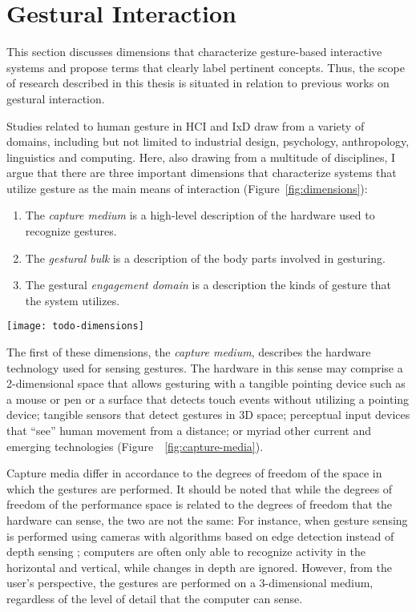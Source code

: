 \section{Gestural Interaction}
\label{sec:gestural-interaction}

This section discusses dimensions that characterize gesture-based interactive systems and propose terms that clearly label pertinent concepts. Thus, the scope of research described in this thesis is situated in relation to previous works on gestural interaction.

Studies related to human gesture in HCI and IxD draw from a variety of domains, including but not limited to industrial design, psychology, anthropology, linguistics and computing. Here, also drawing from a multitude of disciplines, I argue that there are three important dimensions that characterize systems that utilize gesture as the main means of interaction (Figure~\ref{fig:dimensions}):

\begin{enumerate}
\item The \emph{capture medium} is a high-level description of the hardware used to recognize gestures.
\item	The \emph{gestural bulk} is a description of the body parts involved in gesturing.
\item The gestural \emph{engagement domain} is a description the kinds of gesture that the system utilizes.
\end{enumerate}

\begin{SCfigure}[\sidecaptionrelwidth][ht]
\centering
\texttt{[image: todo-dimensions]}
\caption{Visualizing the three dimensions that characterize gesture-based interactive systems.}
\label{fig:dimensions}
\end{SCfigure}

The first of these dimensions, the \emph{capture medium}, describes the hardware technology used for sensing gestures. The hardware in this sense may comprise a 2-dimensional space that allows gesturing with a tangible pointing device such as a mouse or pen or a surface that detects touch events without utilizing a pointing device; tangible sensors that detect gestures in 3D space; perceptual input devices that “see” human movement from a distance; or myriad other current and emerging technologies (Figure~~\ref{fig:capture-media}).

Capture media differ in accordance to the degrees of freedom of the space in which the gestures are performed. It should be noted that while the degrees of freedom of the performance space is related to the degrees of freedom that the hardware can sense, the two are not the same: For instance, when gesture sensing is performed using cameras with algorithms based on edge detection instead of depth sensing \parencite{Moeslund:2001, Moeslund:2006}; computers are often only able to recognize activity in the horizontal and vertical, while changes in depth are ignored. However, from the user’s perspective, the gestures are performed on a 3-dimensional medium, regardless of the level of detail that the computer can sense.

